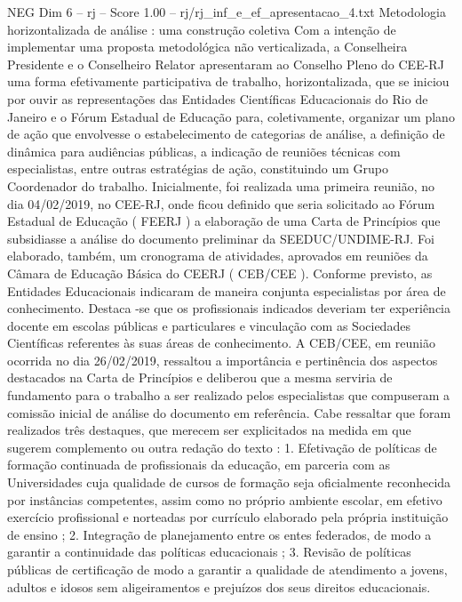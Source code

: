 \begin{textsample}{NEG Dim 6 – rj – Score 1.00 – rj/rj\_inf\_e\_ef\_apresentacao\_4.txt}  \label{ex:f6_neg_003}
Metodologia horizontalizada de análise : uma construção coletiva Com a intenção de implementar uma proposta metodológica não verticalizada, a Conselheira Presidente e o Conselheiro Relator apresentaram ao Conselho Pleno do CEE-RJ uma forma efetivamente participativa de trabalho, horizontalizada, que se iniciou por ouvir as representações das Entidades Científicas Educacionais do Rio de Janeiro e o Fórum Estadual de Educação para, coletivamente, organizar um plano de ação que envolvesse o estabelecimento de categorias de análise, a definição de dinâmica para audiências públicas, a indicação de reuniões técnicas com especialistas, entre outras estratégias de ação, constituindo um Grupo Coordenador do trabalho.
Inicialmente, foi realizada uma primeira reunião, no dia 04/02/2019, no CEE-RJ, onde ficou definido que seria solicitado ao Fórum Estadual de Educação ( FEERJ ) a elaboração de uma Carta de Princípios que subsidiasse a análise do documento preliminar da SEEDUC/UNDIME-RJ.
Foi elaborado, também, um cronograma de atividades, aprovados em reuniões da Câmara de Educação Básica do CEERJ ( CEB/CEE ).
Conforme previsto, as Entidades Educacionais indicaram de maneira conjunta especialistas por área de conhecimento.
Destaca -se que os profissionais indicados deveriam ter experiência docente em escolas públicas e particulares e vinculação com as Sociedades Científicas referentes às suas áreas de conhecimento.
A CEB/CEE, em reunião ocorrida no dia 26/02/2019, ressaltou a importância e pertinência dos aspectos destacados na Carta de Princípios e deliberou que a mesma serviria de fundamento para o trabalho a ser realizado pelos especialistas que compuseram a comissão inicial de análise do documento em referência.
Cabe ressaltar que foram realizados três destaques, que merecem ser explicitados na medida em que sugerem complemento ou outra redação do texto : 1.
Efetivação de políticas de formação continuada de profissionais da educação, em parceria com as Universidades cuja qualidade de cursos de formação seja oficialmente reconhecida por instâncias competentes, assim como no próprio ambiente escolar, em efetivo exercício profissional e norteadas por currículo elaborado pela própria instituição de ensino ; 2.
Integração de planejamento entre os entes federados, de modo a garantir a continuidade das políticas educacionais ; 3.
Revisão de políticas públicas de certificação de modo a garantir a qualidade de atendimento a jovens, adultos e idosos sem aligeiramentos e prejuízos dos seus direitos educacionais.

\end{textsample}
